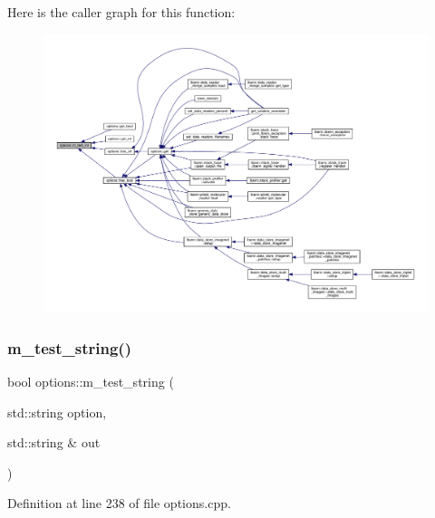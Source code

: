 Here is the caller graph for this function\+:\nopagebreak
\begin{figure}[H]
\begin{center}
\leavevmode
\includegraphics[width=350pt]{classoptions_ad9b4461e633b73acc2fde7752ef60d41_icgraph}
\end{center}
\end{figure}
\mbox{\label{classoptions_a8286a8617eec86a3d4cf678bd17739ba}} 
\subsubsection{\texorpdfstring{m\+\_\+test\+\_\+string()}{m\_test\_string()}}
{\footnotesize\ttfamily bool options\+::m\+\_\+test\+\_\+string (\begin{DoxyParamCaption}\item[{std\+::string}]{option,  }\item[{std\+::string \&}]{out }\end{DoxyParamCaption})\hspace{0.3cm}{\ttfamily [private]}}



Definition at line 238 of file options.\+cpp.


